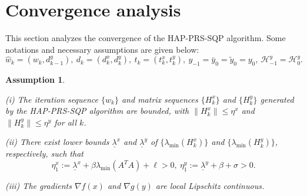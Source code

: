 \documentclass[pdflatex,sn-mathphys-num]{sn-jnl}%
\theoremstyle{thmstyleone}%
\newtheorem{assumption}{Assumption}
\theoremstyle{thmstyletwo}%
\theoremstyle{thmstylethree}%
\begin{document}
\section{Convergence analysis}\label{sec4}
This section analyzes the convergence of the HAP-PRS-SQP algorithm. Some notations and necessary assumptions are given below:
\[
\hat{w}_k=(w_k,d_{k-1}^y),~d_k=({d}_{k}^x,{d}_{k}^y),~t_k=(t_{k}^x,t_{k}^y),~y_{-1}=\bar{y}_0=\tilde{y}_0=y_0,~\mathcal{H}_{-1}^y=\mathcal{H}_0^y.
\]

\begin{assumption}\label{ass1}{\rm
		
		(i) The iteration sequence $\{w_k\}$ and matrix sequences $\{{H}_k^x\}$ and $\{{H}_k^y\}$ generated by the HAP-PRS-SQP algorithm are bounded, with $\|{H}_k^x\|\leq \eta^x$ and $\|{H}_k^y\|\leq \eta^y$ for all $k$.
		
		(ii) There exist lower bounds $\underline{\lambda}^x$ and $\underline{\lambda}^y$ of $\{\lambda_{\min}(H^x_k)\}$ and $\{\lambda_{\min}(H^y_k)\}$, respectively, such that
		\begin{equation}\label{NF01} \eta^x_1:=\underline{\lambda}^x+\beta\lambda_{\min}(A^TA)+\ell>0,\
			\eta^y_1:=\underline{\lambda}^y+\beta+\sigma>0.
		\end{equation}
		
		(iii) The gradients $\nabla f(x)$ and $\nabla g(y)$ are local Lipschitz continuous.
	}
\end{assumption}
\end{document}

